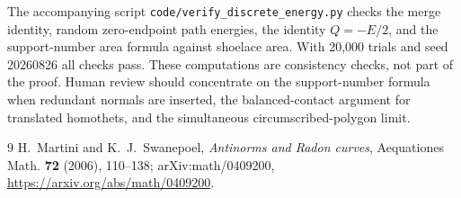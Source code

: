 \documentclass[11pt]{article}
\begin{document}
The accompanying script \texttt{code/verify\_discrete\_energy.py} checks the
merge identity, random zero-endpoint path energies, the identity
$Q=-E/2$, and the support-number area formula against shoelace area.  With
20,000 trials and seed 20260826 all checks pass.  These computations are
consistency checks, not part of the proof.  Human review should concentrate
on the support-number formula when redundant normals are inserted, the
balanced-contact argument for translated homothets, and the simultaneous
circumscribed-polygon limit.

\begin{thebibliography}{9}
H.~Martini and K.~J.~Swanepoel,
\emph{Antinorms and Radon curves},
Aequationes Math. \textbf{72} (2006), 110--138;
arXiv:math/0409200,
\url{https://arxiv.org/abs/math/0409200}.
\end{thebibliography}
\end{document}

